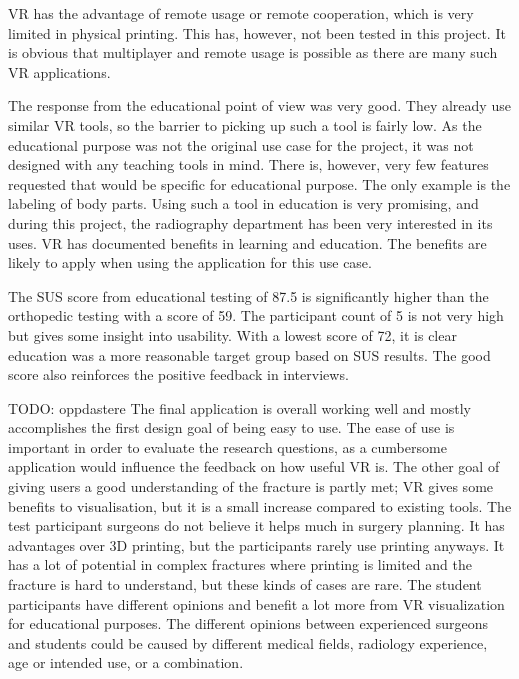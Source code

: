 \documentclass[a4paper]{report}
\begin{document}
VR has the advantage of remote usage or remote cooperation, which is very limited in physical printing. This has, however, not been tested in this project. It is obvious that multiplayer and remote usage is possible as there are many such VR applications.




The response from the educational point of view was very good. They already use similar VR tools, so the barrier to picking up such a tool is fairly low.
As the educational purpose was not the original use case for the project, it was not designed with any teaching tools in mind. There is, however, very few features requested that would be specific for educational purpose. The only example is the labeling of body parts. 
Using such a tool in education is very promising, and during this project, the radiography department has been very interested in its uses.
VR has documented benefits in learning and education. The benefits are likely to apply when using the application for this use case.

The SUS score from educational testing of 87.5 is significantly higher than the orthopedic testing with a score of 59.
The participant count of 5 is not very high but gives some insight into usability. With a lowest score of 72, it is clear education was a more reasonable target group based on SUS results. The good score also reinforces the positive feedback in interviews.

TODO: oppdastere
The final application is overall working well and mostly accomplishes the first design goal of being easy to use. The ease of use is important in order to evaluate the research questions, as a cumbersome application would influence the feedback on how useful VR is.
The other goal of giving users a good understanding of the fracture is partly met; VR gives some benefits to visualisation, but it is a small increase compared to existing tools.
The test participant surgeons do not believe it helps much in surgery planning. It has advantages over 3D printing, but the participants rarely use printing anyways. It has a lot of potential in complex fractures where printing is limited and the fracture is hard to understand, but these kinds of cases are rare.
The student participants have different opinions and benefit a lot more from VR visualization for educational purposes. The different opinions between experienced surgeons and students could be caused by different medical fields, radiology experience, age or intended use, or a combination.
\end{document}

